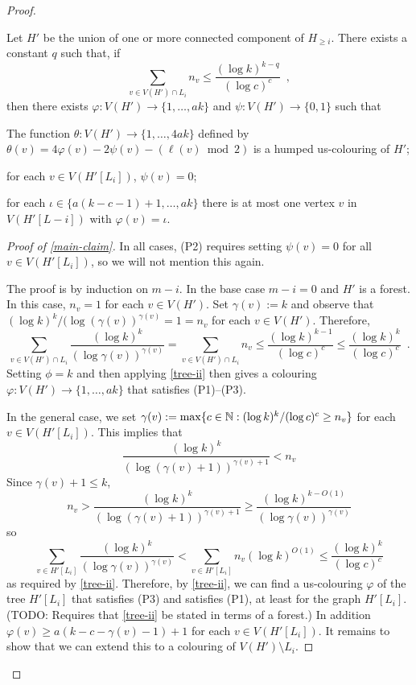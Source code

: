\documentclass[kpfonts]{patmorin}
\begin{document}
\begin{proof}
    \begin{clm}\label{main-claim}
        Let $H'$ be the union of one or more connected component of $H_{\ge i}$. There exists a constant $q$ such that,  if
        \[
            \sum_{v\in V(H')\cap L_i} n_v\le \frac{(\log k)^{k-q}}{(\log c)^c} \enspace ,
        \]
        then there exists $\varphi:V(H')\to\{1,\ldots,ak\}$ and $\psi:V(H')\to\{0,1\}$ such that
        \begin{compactenum}[(P1)]
            \item The function $\theta:V(H')\to\{1,\ldots,4ak\}$ defined by $\theta(v)=4\varphi(v) - 2\psi(v) -(\ell(v)\bmod 2)$ is a humped us-colouring of $H'$;
            \item for each $v\in V(H'[L_i])$, $\psi(v)=0$;
            \item for each $\iota\in\{a(k-c-1)+1,\ldots,ak\}$ there is at most one vertex $v$ in $V(H'[L-i])$ with $\varphi(v)=\iota$.
        \end{compactenum}
    \end{clm}

    \begin{proof}[Proof of \cref{main-claim}]
        In all cases, (P2) requires setting $\psi(v)=0$ for all $v\in V(H'[L_i])$, so we will not mention this again.

        The proof is by induction on $m-i$. In the base case $m-i=0$ and $H'$ is a forest.  In this case, $n_v=1$ for each $v\in V(H')$.  Set $\gamma(v):=k$ and observe that $(\log k)^k/(\log(\gamma(v))^{\gamma(v)}=1=n_v$ for each $v\in V(H')$. Therefore,
        \[
            \sum_{v\in V(H')\cap L_i} \frac{(\log k)^k}{(\log \gamma(v))^{\gamma(v)}} = \sum_{v\in V(H')\cap L_i} n_v
            \le \frac{(\log k)^{k-1}}{(\log c)^c}
            \le \frac{(\log k)^{k}}{(\log c)^c} \enspace .
        \]
        Setting $\phi=k$ and then applying \cref{tree-ii} then gives a colouring $\varphi: V(H')\to\{1,\ldots,ak\}$ that satisfies (P1)--(P3).

        In the general case, we set $\gamma(v):=\max\{c\in\mathbb{N}:(\log k)^k/(\log c)^c \ge n_v\}$ for each $v\in V(H'[L_i])$.  This implies that
        \[
            \frac{(\log k)^k}{(\log(\gamma(v)+1))^{\gamma(v)+1}} < n_v
        \]
        Since $\gamma(v)+1\le k$,
        \[
           n_v > \frac{(\log k)^k}{(\log(\gamma(v)+1))^{\gamma(v)+1}} \ge
           \frac{(\log k)^{k-O(1)}}{(\log\gamma(v))^{\gamma(v)}}
       \]
       so
       \[
           \sum_{v\in H'[L_i]} \frac{(\log k)^k}{(\log \gamma(v))^{\gamma(v)}} < \sum_{v\in H'[L_i]} n_v(\log k)^{O(1)} \le \frac{(\log k)^k}{(\log c)^c}
       \]
       as required by \cref{tree-ii}.  Therefore, by \cref{tree-ii}, we can find a us-colouring $\varphi$ of the tree $H'[L_i]$ that satisfies (P3) and satisfies (P1), at least for the graph $H'[L_i]$. (TODO: Requires that \cref{tree-ii} be stated in terms of a forest.) In addition $\varphi(v)\ge a(k-c-\gamma(v)-1)+1$ for each $v\in V(H'[L_i])$.  It remains to show that we can extend this to a colouring of $V(H')\setminus L_i$.


\end{proof}
\end{proof}
\end{document}
